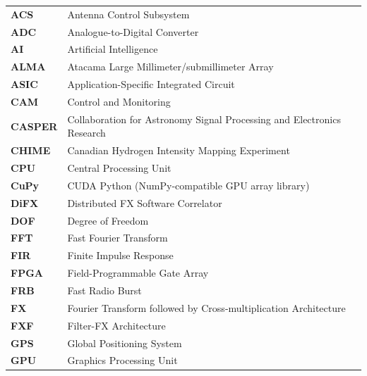 \documentclass[a4paper,oneside,11pt]{book}
\begin{document}





\tableofcontents
\listoffigures


\begin{TableOfAbbrev}
    \begin{longtable}{ll}
        \textbf{ACS} & Antenna Control Subsystem \\
        \textbf{ADC} & Analogue-to-Digital Converter \\
        \textbf{AI} & Artificial Intelligence \\
        \textbf{ALMA} & Atacama Large Millimeter/submillimeter Array \\
        \textbf{ASIC} & Application-Specific Integrated Circuit \\
        \textbf{CAM} & Control and Monitoring \\
        \textbf{CASPER} & Collaboration for Astronomy Signal Processing and Electronics Research \\
        \textbf{CHIME} & Canadian Hydrogen Intensity Mapping Experiment \\
        \textbf{CPU} & Central Processing Unit \\
        \textbf{CuPy} & CUDA Python (NumPy-compatible GPU array library) \\
        \textbf{DiFX} & Distributed FX Software Correlator \\
        \textbf{DOF} & Degree of Freedom \\
        \textbf{FFT} & Fast Fourier Transform \\
        \textbf{FIR} & Finite Impulse Response \\
        \textbf{FPGA} & Field-Programmable Gate Array \\
        \textbf{FRB} & Fast Radio Burst \\
        \textbf{FX} & Fourier Transform followed by Cross-multiplication Architecture \\
        \textbf{FXF} & Filter-FX Architecture \\
        \textbf{GPS} & Global Positioning System \\
        \textbf{GPU} & Graphics Processing Unit \\

\end{longtable}
\end{TableOfAbbrev}
\end{document}
